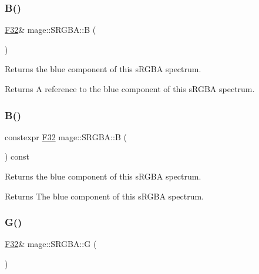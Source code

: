 \subsubsection{\texorpdfstring{B()}{B()}\hspace{0.1cm}{\footnotesize\ttfamily [1/2]}}
{\footnotesize\ttfamily \mbox{\hyperlink{namespacemage_aa97e833b45f06d60a0a9c4fc22ae02c0}{F32}}\& mage\+::\+S\+R\+G\+B\+A\+::B (\begin{DoxyParamCaption}{ }\end{DoxyParamCaption})\hspace{0.3cm}{\ttfamily [noexcept]}}

Returns the blue component of this s\+R\+G\+BA spectrum.

\begin{DoxyReturn}{Returns}
A reference to the blue component of this s\+R\+G\+BA spectrum. 
\end{DoxyReturn}
\mbox{\label{structmage_1_1_s_r_g_b_a_a8d69a7e851ff5ba5fb35a80d62ffc3c4}} 
\subsubsection{\texorpdfstring{B()}{B()}\hspace{0.1cm}{\footnotesize\ttfamily [2/2]}}
{\footnotesize\ttfamily constexpr \mbox{\hyperlink{namespacemage_aa97e833b45f06d60a0a9c4fc22ae02c0}{F32}} mage\+::\+S\+R\+G\+B\+A\+::B (\begin{DoxyParamCaption}{ }\end{DoxyParamCaption}) const\hspace{0.3cm}{\ttfamily [noexcept]}}

Returns the blue component of this s\+R\+G\+BA spectrum.

\begin{DoxyReturn}{Returns}
The blue component of this s\+R\+G\+BA spectrum. 
\end{DoxyReturn}
\mbox{\label{structmage_1_1_s_r_g_b_a_a2ad28d716342f58267297875a696f8e5}} 
\subsubsection{\texorpdfstring{G()}{G()}\hspace{0.1cm}{\footnotesize\ttfamily [1/2]}}
{\footnotesize\ttfamily \mbox{\hyperlink{namespacemage_aa97e833b45f06d60a0a9c4fc22ae02c0}{F32}}\& mage\+::\+S\+R\+G\+B\+A\+::G (\begin{DoxyParamCaption}{ }\end{DoxyParamCaption})\hspace{0.3cm}{\ttfamily [noexcept]}}

